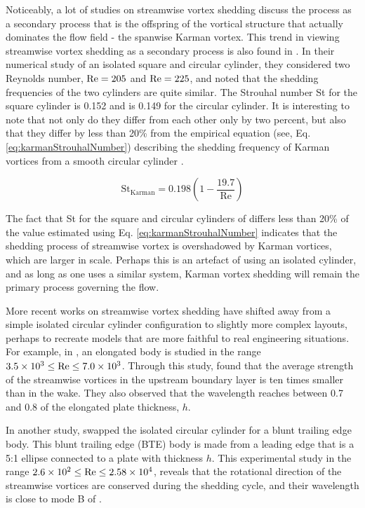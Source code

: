 \documentclass[oneside]{utmthesis}
\begin{document}
Noticeably, a lot of studies on streamwise vortex shedding discuss the process as a secondary process that is the offspring of the vortical structure that actually dominates the flow field - the spanwise Karman vortex. This trend in viewing streamwise vortex shedding as a secondary process is also found in \citet{Agbaglah2019}. In their numerical study of an isolated square and circular cylinder, they considered two Reynolds number, $\text{Re} = 205$ and $\text{Re} = 225$, and noted that the shedding frequencies of the two cylinders are quite similar. The Strouhal number St for the square cylinder is 0.152 and is 0.149 for the circular cylinder. It is interesting to note that not only do they differ from each other only by two percent, but also that they differ by less than 20\% from the empirical equation (see, Eq. \ref{eq:karmanStrouhalNumber}) describing the shedding frequency of Karman vortices from a smooth circular cylinder \citep{Blevins1990}.

\begin{equation}
  \text{St}_{\text{Karman}} = 0.198 \left( 1 - \frac{19.7}{\text{Re}} \right)
  \label{eq:karmanStrouhalNumber}
\end{equation}

The fact that St for the square and circular cylinders of \citet{Agbaglah2019} differs less than 20\% of the value estimated using Eq. \ref{eq:karmanStrouhalNumber} indicates that the shedding process of streamwise vortex is overshadowed by Karman vortices, which are larger in scale. Perhaps this is an artefact of using an isolated cylinder, and as long as one uses a similar system, Karman vortex shedding will remain the primary process governing the flow.

More recent works on streamwise vortex shedding have shifted away from a simple isolated circular cylinder configuration to slightly more complex layouts, perhaps to recreate models that are more faithful to real engineering situations. For example, in \citet{Gibeau2018}, an elongated body is studied in the range $3.5 \times 10^{3} \leq \text{Re} \leq 7.0 \times 10^{3}$. Through this study, \citet{Gibeau2018} found that the average strength of the streamwise vortices in the upstream boundary layer is ten times smaller than in the wake. They also observed that the wavelength reaches between 0.7 and 0.8 of the elongated plate thickness, $h$.

 In another study, \citet{Gibeau2019} swapped the isolated circular cylinder for a blunt trailing edge body. This blunt trailing edge (BTE) body is made from a leading edge that is a 5:1 ellipse connected to a plate with thickness $h$. This experimental study in the range $2.6 \times 10^{2} \leq \text{Re} \leq 2.58 \times 10^{4}$, reveals that the rotational direction of the streamwise vortices are conserved during the shedding cycle, and their wavelength is close to mode B of \citet{Williamson1996a}.
\end{document}
